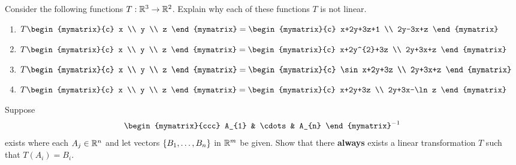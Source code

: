 \begin{ex} Consider the following functions $T:\mathbb{R}^{3}\rightarrow \mathbb{R}^{2}$.
  Explain why each of these functions $T$ is not linear.

  \begin{enumerate}
  \item $T\begin{mymatrix}{c}
      x \\
      y \\
      z
    \end{mymatrix} =\begin{mymatrix}{c}
      x+2y+3z+1 \\
      2y-3x+z
    \end{mymatrix} $

  \item $T\begin{mymatrix}{c}
      x \\
      y \\
      z
    \end{mymatrix} =\begin{mymatrix}{c}
      x+2y^{2}+3z \\
      2y+3x+z
    \end{mymatrix} $

  \item $T\begin{mymatrix}{c}
      x \\
      y \\
      z
    \end{mymatrix} =\begin{mymatrix}{c}
      \sin x+2y+3z \\
      2y+3x+z
    \end{mymatrix} $

  \item $T\begin{mymatrix}{c}
      x \\
      y \\
      z
    \end{mymatrix} =\begin{mymatrix}{c}
      x+2y+3z \\
      2y+3x-\ln z
    \end{mymatrix} $
  \end{enumerate}
\end{ex}

\begin{ex} Suppose
  \begin{equation*}
    \begin{mymatrix}{ccc}
      A_{1} & \cdots & A_{n}
    \end{mymatrix} ^{-1}
  \end{equation*}
  exists where each $A_{j}\in \mathbb{R}^{n}$ and let
  vectors  $\left\{B_{1},\ldots,B_{n}\right\} $ in $\mathbb{R}^{m}$ be given.
  Show that there \textbf{always }exists a linear
  transformation $T$ such that $T(A_{i})=B_{i}$.
\end{ex}

